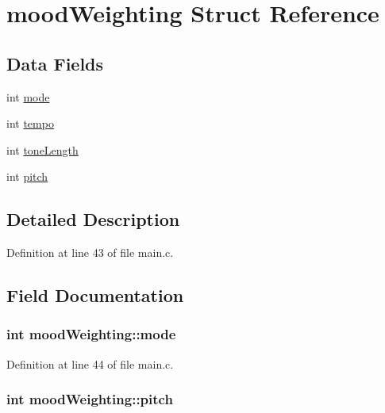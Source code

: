 \hypertarget{structmood_weighting}{\section{mood\+Weighting Struct Reference}
\label{structmood_weighting}
}
\subsection*{Data Fields}
\begin{DoxyCompactItemize}
\item 
int \hyperlink{structmood_weighting_a61010f3a9441ad3cabbe94a31a64dad5}{mode}
\item 
int \hyperlink{structmood_weighting_a9b2180e8a4aab163ae48d0a66269a840}{tempo}
\item 
int \hyperlink{structmood_weighting_ab9e917ae02761f06d11c59645a45536d}{tone\+Length}
\item 
int \hyperlink{structmood_weighting_a27410ec4f299961816407657a3e241e8}{pitch}
\end{DoxyCompactItemize}


\subsection{Detailed Description}


Definition at line 43 of file main.\+c.



\subsection{Field Documentation}
\hypertarget{structmood_weighting_a61010f3a9441ad3cabbe94a31a64dad5}{
\subsubsection[{mode}]{\setlength{\rightskip}{0pt plus 5cm}int mood\+Weighting\+::mode}}\label{structmood_weighting_a61010f3a9441ad3cabbe94a31a64dad5}


Definition at line 44 of file main.\+c.

\hypertarget{structmood_weighting_a27410ec4f299961816407657a3e241e8}{
\subsubsection[{pitch}]{\setlength{\rightskip}{0pt plus 5cm}int mood\+Weighting\+::pitch}}\label{structmood_weighting_a27410ec4f299961816407657a3e241e8}


